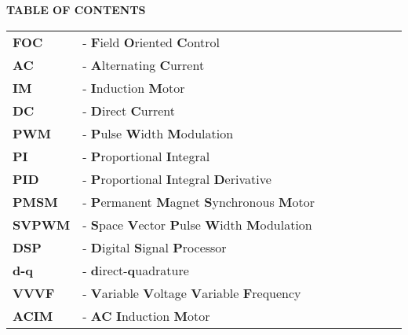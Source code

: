 \begin{center}
    {\large \textbf{TABLE OF CONTENTS}}
\end{center}

\vspace{0.1in}

\begin{center}
\end{center}

\tableofcontents

\newpage
\listoffigures
{}

\newpage

\newpage
{}


\vspace{10mm}


\noindent
\begin{tabular}{@{} >{\bfseries}l p{1.0\linewidth}}
\textbf{FOC} & -  \textbf{F}ield \textbf{O}riented \textbf{C}ontrol \\
\textbf{AC} & -  \textbf{A}lternating \textbf{C}urrent \\
\textbf{IM} & -  \textbf{I}nduction \textbf{M}otor \\
\textbf{DC} & -  \textbf{D}irect \textbf{C}urrent \\
\textbf{PWM} & -  \textbf{P}ulse \textbf{W}idth \textbf{M}odulation \\
\textbf{PI} & -  \textbf{P}roportional \textbf{I}ntegral \\
\textbf{PID} & -  \textbf{P}roportional \textbf{I}ntegral \textbf{D}erivative \\
\textbf{PMSM} & -  \textbf{P}ermanent \textbf{M}agnet \textbf{S}ynchronous \textbf{M}otor \\
\textbf{SVPWM} & -  \textbf{S}pace \textbf{V}ector \textbf{P}ulse \textbf{W}idth \textbf{M}odulation \\
\textbf{DSP} & -  \textbf{D}igital \textbf{S}ignal \textbf{P}rocessor \\
\textbf{d-q} & -  \textbf{d}irect-\textbf{q}uadrature \\
\textbf{VVVF} & -  \textbf{V}ariable \textbf{V}oltage \textbf{V}ariable \textbf{F}requency \\
\textbf{ACIM} & -  \textbf{AC} \textbf{I}nduction \textbf{M}otor \\
\end{tabular}

\newpage